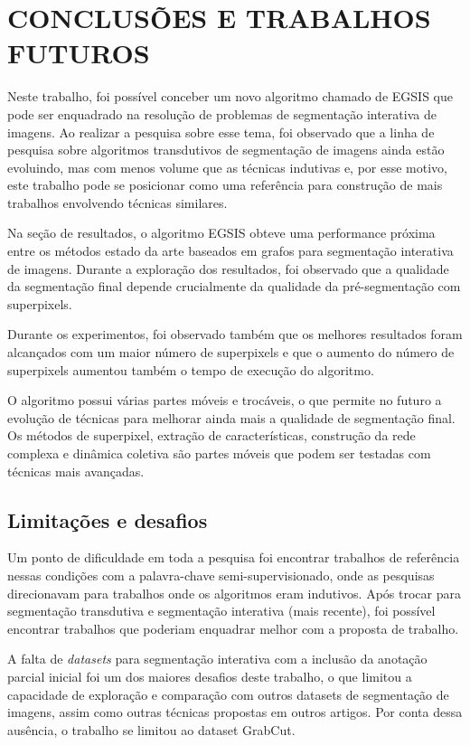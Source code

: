 \chapter{CONCLUSÕES E TRABALHOS FUTUROS}\label{chap:conclusoes-e-trabalhos-futuros}

Neste trabalho, foi possível conceber um novo algoritmo chamado de
\gls{EGSIS} que pode ser enquadrado na resolução de problemas de
segmentação interativa de imagens. Ao realizar a pesquisa sobre esse
tema, foi observado que a linha de pesquisa sobre algoritmos
transdutivos de segmentação de imagens ainda estão evoluindo, mas com
menos volume que as técnicas indutivas e, por esse motivo, este
trabalho pode se posicionar como uma referência para construção de
mais trabalhos envolvendo técnicas similares.

Na seção de resultados, o algoritmo \gls{EGSIS} obteve uma performance
próxima entre os métodos estado da arte baseados em grafos para
segmentação interativa de imagens. Durante a exploração dos
resultados, foi observado que a qualidade da segmentação final depende
crucialmente da qualidade da pré-segmentação com superpixels.

Durante os experimentos, foi observado também que os melhores
resultados foram alcançados com um maior número de superpixels e que
o aumento do número de superpixels aumentou também o tempo de
execução do algoritmo.

O algoritmo possui várias partes móveis e trocáveis, o que permite no
futuro a evolução de técnicas para melhorar ainda mais a qualidade de
segmentação final. Os métodos de superpixel, extração de
características, construção da rede complexa e dinâmica coletiva são
partes móveis que podem ser testadas com técnicas mais avançadas.

\section{Limitações e desafios}\label{sec:limitacoes-desafios}

Um ponto de dificuldade em toda a pesquisa foi encontrar trabalhos
de referência nessas condições com a palavra-chave
semi-supervisionado, onde as pesquisas direcionavam para trabalhos
onde os algoritmos eram indutivos. Após trocar para segmentação
transdutiva e segmentação interativa (mais recente), foi possível
encontrar trabalhos que poderiam enquadrar melhor com a proposta de
trabalho.

A falta de \textit{datasets} para segmentação interativa com a
inclusão da anotação parcial inicial foi um dos maiores desafios
deste trabalho, o que limitou a capacidade de exploração e comparação
com outros datasets de segmentação de imagens, assim como outras
técnicas propostas em outros artigos. Por conta dessa ausência, o
trabalho se limitou ao dataset GrabCut.

